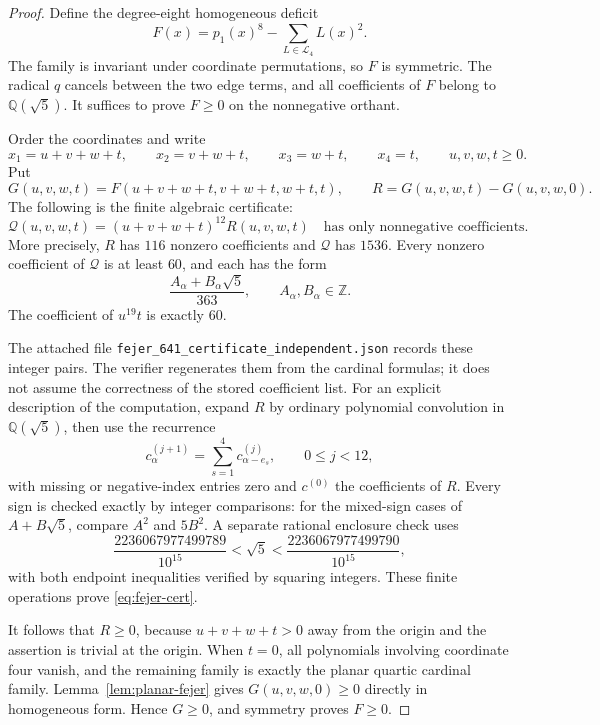 \documentclass[11pt,a4paper]{article}
\theoremstyle{definition}
\theoremstyle{remark}
\numberwithin{equation}{section}
\begin{document}
\begin{proof}
Define the degree-eight homogeneous deficit
\[
 F(x)=p_1(x)^8-\sum_{L\in\mathcal L_4}L(x)^2.
\]
The family is invariant under coordinate permutations, so $F$ is
symmetric.  The radical $q$ cancels between the two edge terms, and all
coefficients of $F$ belong to $\mathbb Q(\sqrt5)$.
It suffices to prove $F\ge0$ on the nonnegative orthant.

Order the coordinates and write
\[
 x_1=u+v+w+t,\qquad x_2=v+w+t,\qquad
 x_3=w+t,\qquad x_4=t,
 \qquad u,v,w,t\ge0.
\]
Put
\[
 G(u,v,w,t)=F(u+v+w+t,v+w+t,w+t,t),
 \qquad
 R=G(u,v,w,t)-G(u,v,w,0).
\]
The following is the finite algebraic certificate:
\begin{equation}\label{eq:fejer-cert}
 \mathcal Q(u,v,w,t)=(u+v+w+t)^{12}R(u,v,w,t)
 \quad\text{has only nonnegative coefficients.}
\end{equation}
More precisely, $R$ has $116$ nonzero coefficients and $\mathcal Q$
has $1536$.  Every nonzero coefficient of $\mathcal Q$ is at least
$60$, and each has the form
\begin{equation}\label{eq:fejer-field}
 \frac{A_\alpha+B_\alpha\sqrt5}{363},
 \qquad A_\alpha,B_\alpha\in\mathbb Z.
\end{equation}
The coefficient of $u^{19}t$ is exactly $60$.

The attached file
\texttt{fejer\_641\_certificate\_independent.json} records these
integer pairs.  The verifier regenerates them from the cardinal formulas;
it does not assume the correctness of the stored coefficient list.
For an explicit description of the computation, expand $R$ by ordinary
polynomial convolution in $\mathbb Q(\sqrt5)$, then use the recurrence
\begin{equation}\label{eq:fejer-recurrence}
 c_\alpha^{(j+1)}=\sum_{s=1}^4c_{\alpha-e_s}^{(j)},
 \qquad 0\le j<12,
\end{equation}
with missing or negative-index entries zero and $c^{(0)}$ the
coefficients of $R$.  Every sign is checked exactly by integer
comparisons: for the mixed-sign cases of $A+B\sqrt5$, compare
$A^2$ and $5B^2$.  A separate rational enclosure check uses
\[
 \frac{2236067977499789}{10^{15}}<\sqrt5<
 \frac{2236067977499790}{10^{15}},
\]
with both endpoint inequalities verified by squaring integers.
These finite operations prove \eqref{eq:fejer-cert}.

It follows that $R\ge0$, because $u+v+w+t>0$ away from the
origin and the assertion is trivial at the origin.  When $t=0$, all
polynomials involving coordinate four vanish, and the remaining family
is exactly the planar quartic cardinal family.
Lemma~\ref{lem:planar-fejer} gives $G(u,v,w,0)\ge0$ directly in
homogeneous form.  Hence $G\ge0$, and symmetry proves $F\ge0$.


\end{proof}
\end{document}
